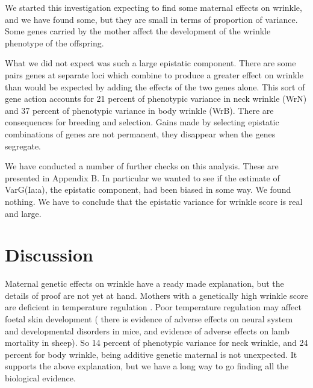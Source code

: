 \documentclass[titlepage]{article}  %
\begin{document}
We started this investigation expecting to find some maternal effects on wrinkle, and we have found some, but they are small in terms of proportion of variance. Some genes carried by the mother affect the development of the wrinkle phenotype of the offspring. 

What we did not expect was such a large epistatic component. There are some pairs genes at separate loci which combine to produce a greater effect on wrinkle than would be expected by adding the effects of the two genes alone. This sort of gene action accounts for 21 percent of phenotypic variance in neck wrinkle (WrN) and 37 percent of phenotypic variance in body wrinkle (WrB). There are consequences for breeding and selection. Gains made by selecting epistatic combinations of genes are not permanent, they disappear when the genes segregate.

We have conducted a number of further checks on this analysis. These are presented in Appendix B. In particular we wanted to see if the estimate of VarG(Ia:a), the epistatic component, had been biased in some way. We found nothing. We have to conclude that the epistatic variance for wrinkle score is real and large.



\section{Discussion}
Maternal genetic effects on wrinkle  have a ready made explanation, but the details of proof are not yet at hand. Mothers with a genetically high wrinkle score are deficient in temperature regulation . Poor temperature regulation may affect foetal skin development ( there is evidence of adverse effects on neural system and developmental disorders in mice, and evidence of adverse effects on lamb mortality in sheep). So 14 percent of phenotypic variance for neck wrinkle, and 24 percent for body wrinkle, being additive genetic maternal is not unexpected.  It supports the above explanation, but we have a long way to go finding all the biological evidence.
\end{document}
